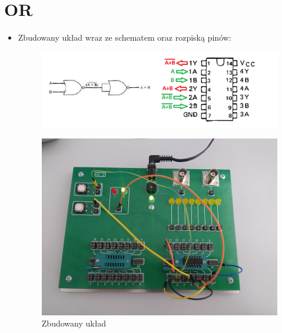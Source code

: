     \section{OR}
        \begin{itemize}
            \item Zbudowany układ wraz ze schematem oraz rozpiską pinów:
                \begin{figure}[H]
                    \centering
                    \includegraphics[width=\textwidth]{img/schemes_with_pins/NOR_or_w_pins.png}
                    \label{NOR:schemat_or_w_pins}
                \end{figure}
                \begin{figure}[H]
                    \centering
                    \includegraphics[width=\textwidth]{img/NOR/funkcje/1652306732459_scaled.png}
                    \caption{Zbudowany układ}
                    \label{NOR:zbudowany_układ_OR}
                \end{figure}
                
        \pagebreak            
                    

\end{itemize}
